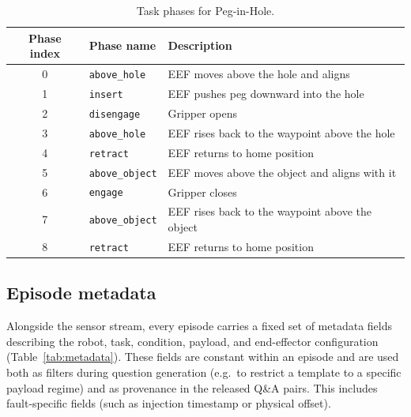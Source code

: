\documentclass{article}
\begin{document}
\begin{table}[htbp]
    \centering
    \caption{Task phases for Peg-in-Hole.}
    \label{tab:phases_peg}
    \small
    \begin{tabular}{clp{8cm}}
        \toprule
        Phase index & Phase name             & Description                                     \\
        \midrule
        0           & \texttt{above\_hole}   & EEF moves above the hole and aligns             \\
        1           & \texttt{insert}        & EEF pushes peg downward into the hole           \\
        2           & \texttt{disengage}     & Gripper opens                                   \\
        3           & \texttt{above\_hole}   & EEF rises back to the waypoint above the hole   \\
        4           & \texttt{retract}       & EEF returns to home position                    \\
        5           & \texttt{above\_object} & EEF moves above the object and aligns with it   \\
        6           & \texttt{engage}        & Gripper closes                                  \\
        7           & \texttt{above\_object} & EEF rises back to the waypoint above the object \\
        8           & \texttt{retract}       & EEF returns to home position                    \\
        \bottomrule
    \end{tabular}
\end{table}

\subsection{Episode metadata}

Alongside the sensor stream, every episode carries a fixed set of metadata fields describing the robot, task, condition, payload, and end-effector configuration (Table~\ref{tab:metadata}). These fields are constant within an episode and are used both as filters during question generation (e.g.\ to restrict a template to a specific payload regime) and as provenance in the released Q\&A pairs. This includes fault-specific fields (such as injection timestamp or physical offset).
\end{document}
